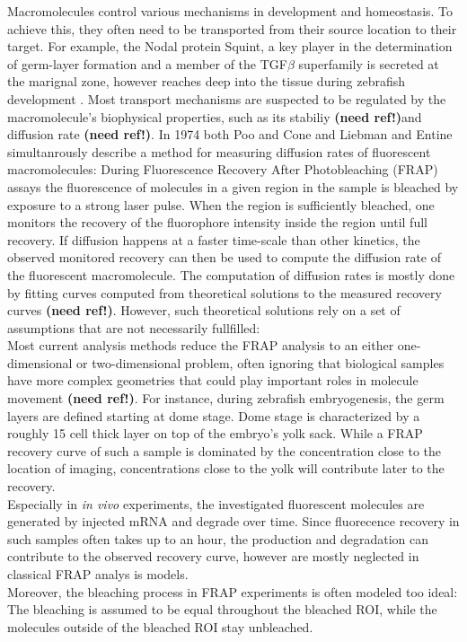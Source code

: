 \documentclass[a4paper,10pt,twocolumn]{article}
\newcommand{\nref}{\textbf{(need ref!)}}
\begin{document}
Macromolecules control various mechanisms in development and homeostasis. To achieve this, they often need to be transported from their source location to their target. For example, the Nodal protein Squint,
a key player in the determination of germ-layer formation and a member of the TGF$\beta$ superfamily is secreted at the marignal zone, however reaches deep into the tissue during zebrafish development 
\citep{Mueller2012}. Most transport mechanisms are suspected to be regulated by the macromolecule's biophysical properties, such as its stabiliy \nref and diffusion rate \nref. In 1974 both Poo and Cone and
Liebman and Entine simultanrously describe a method for measuring diffusion rates of fluorescent macromolecules: During Fluorescence Recovery After Photobleaching (FRAP) assays the fluorescence of
molecules in a given region in the sample is bleached by exposure to a strong laser pulse. When the region is sufficiently bleached, one monitors the recovery of the fluorophore intensity inside the region
until full recovery. If diffusion happens at a faster time-scale than other kinetics, the observed monitored recovery can then be used to compute the diffusion rate of the fluorescent macromolecule.
The computation of diffusion rates is mostly done by fitting curves computed from theoretical solutions to the measured recovery curves \nref. However, such theoretical solutions rely on a set of assumptions that are not necessarily 
fullfilled:\\
Most current analysis methods reduce the FRAP analysis to an either one-dimensional or two-dimensional problem, often ignoring that biological samples have more complex geometries that could play
important roles in molecule movement \nref. For instance, during zebrafish embryogenesis, the germ layers are defined starting at dome stage. Dome stage is characterized by a roughly 15 cell thick layer on 
top of the embryo's yolk sack. While a FRAP recovery curve of such a sample is dominated by the concentration close to the location of imaging, concentrations close to the yolk will contribute later to the
recovery. \\
Especially in \textit{in vivo} experiments, the investigated fluorescent molecules are generated by injected mRNA and degrade over time. Since fluorecence recovery in such samples often takes up to an hour,
the production and degradation can contribute to the observed recovery curve, however are mostly neglected in classical FRAP analys is models. \\
Moreover, the bleaching process in FRAP experiments is often modeled too ideal: The bleaching is assumed to be equal throughout the bleached ROI, while the molecules outside of the bleached ROI stay unbleached.
\end{document}
